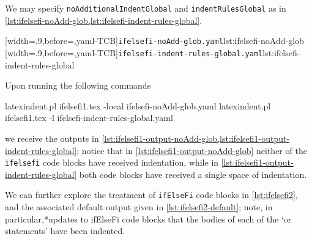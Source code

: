 \documentclass[10pt]{article}
\begin{document}
 \begin{example}
 We may specify \texttt{noAdditionalIndentGlobal} and \texttt{indentRulesGlobal} as in
 \cref{lst:ifelsefi-noAdd-glob,lst:ifelsefi-indent-rules-global}.

 \begin{cmhtcbraster}
  [width=.9\linewidth,before=\centering,yaml-TCB]{\texttt{ifelsefi-noAdd-glob.yaml}}{lst:ifelsefi-noAdd-glob}
  [width=.9\linewidth,before=\centering,yaml-TCB]{\texttt{ifelsefi-indent-rules-global.yaml}}{lst:ifelsefi-indent-rules-global}
 \end{cmhtcbraster}

 Upon running the following commands 

 \begin{commandshell}
latexindent.pl ifelsefi1.tex -local ifelsefi-noAdd-glob.yaml  
latexindent.pl ifelsefi1.tex -l ifelsefi-indent-rules-global.yaml  
\end{commandshell}

 we receive the outputs in
 \cref{lst:ifelsefi1-output-noAdd-glob,lst:ifelsefi1-output-indent-rules-global}; notice
 that in \cref{lst:ifelsefi1-output-noAdd-glob} neither of the \texttt{ifelsefi} code
 blocks have received indentation, while in
 \cref{lst:ifelsefi1-output-indent-rules-global} both code blocks have received a single
 space of indentation.

 \begin{cmhtcbraster}
 \end{cmhtcbraster}
 \end{example}

 \begin{example}
 We can further explore the treatment of \texttt{ifElseFi} code blocks in
 \cref{lst:ifelsefi2}, and the associated default output given in
 \cref{lst:ifelsefi2-default}; note, in particular,*{updates to
 ifElseFi code blocks} that the bodies of each of the `or statements' have been indented.%

 \begin{cmhtcbraster}[raster column skip=.1\linewidth]
 \end{cmhtcbraster}
 \end{example}
\end{document}
